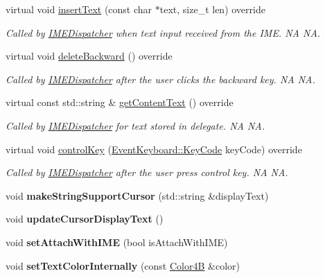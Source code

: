 \begin{DoxyCompactItemize}
virtual void \hyperlink{classTextFieldTTF_af6b585e4ece109522a7aa5d324c2fc12}{insert\+Text} (const char $\ast$text, size\+\_\+t len) override
\begin{DoxyCompactList}\small\item\em Called by \hyperlink{classIMEDispatcher}{I\+M\+E\+Dispatcher} when text input received from the I\+ME.  NA  NA. \end{DoxyCompactList}\item 
\mbox{\label{classTextFieldTTF_acd99171e373c5c27522d0bbe0403f39e}} 
virtual void \hyperlink{classTextFieldTTF_acd99171e373c5c27522d0bbe0403f39e}{delete\+Backward} () override
\begin{DoxyCompactList}\small\item\em Called by \hyperlink{classIMEDispatcher}{I\+M\+E\+Dispatcher} after the user clicks the backward key.  NA  NA. \end{DoxyCompactList}\item 
\mbox{\label{classTextFieldTTF_a6078dbca466a7c7bc9009f2a63c2bac2}} 
virtual const std\+::string \& \hyperlink{classTextFieldTTF_a6078dbca466a7c7bc9009f2a63c2bac2}{get\+Content\+Text} () override
\begin{DoxyCompactList}\small\item\em Called by \hyperlink{classIMEDispatcher}{I\+M\+E\+Dispatcher} for text stored in delegate.  NA  NA. \end{DoxyCompactList}\item 
\mbox{\label{classTextFieldTTF_a1f7133dbda0ce6b38470b4cfd1134e42}} 
virtual void \hyperlink{classTextFieldTTF_a1f7133dbda0ce6b38470b4cfd1134e42}{control\+Key} (\hyperlink{classEventKeyboard_a7cd3fa46515673276ce8ec7f0e051606}{Event\+Keyboard\+::\+Key\+Code} key\+Code) override
\begin{DoxyCompactList}\small\item\em Called by \hyperlink{classIMEDispatcher}{I\+M\+E\+Dispatcher} after the user press control key.  NA  NA. \end{DoxyCompactList}\item 
\mbox{\label{classTextFieldTTF_a72b8543dbed4274865196145f1a7f3b7}} 
void {\bfseries make\+String\+Support\+Cursor} (std\+::string \&display\+Text)
\item 
\mbox{\label{classTextFieldTTF_a93d030811f06078c36461d4f0029f9fe}} 
void {\bfseries update\+Cursor\+Display\+Text} ()
\item 
\mbox{\label{classTextFieldTTF_a0ec34082d549d7ab8a26eb9e00dc58a0}} 
void {\bfseries set\+Attach\+With\+I\+ME} (bool is\+Attach\+With\+I\+ME)
\item 
\mbox{\label{classTextFieldTTF_ac45ac4e208aafaacfe745d05480972f6}} 
void {\bfseries set\+Text\+Color\+Internally} (const \hyperlink{structColor4B}{Color4B} \&color)
\end{DoxyCompactItemize}
